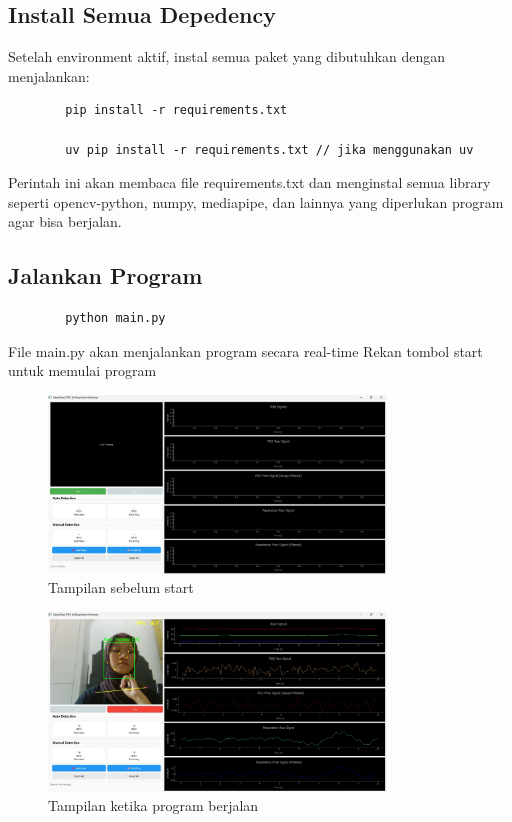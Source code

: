 \documentclass[11pt,a4paper]{article}
\begin{document}
\subsection{Install Semua Depedency}
    Setelah environment aktif, instal semua paket yang dibutuhkan dengan menjalankan:
    \begin{lstlisting}
        pip install -r requirements.txt

        uv pip install -r requirements.txt // jika menggunakan uv\end{lstlisting}
    Perintah ini akan membaca file requirements.txt dan menginstal semua library seperti opencv-python, numpy, mediapipe, dan lainnya yang diperlukan program agar bisa berjalan.

\subsection{Jalankan Program}
    \begin{lstlisting}
        python main.py\end{lstlisting}
    File main.py akan menjalankan program secara real-time
    Rekan tombol start untuk memulai program
    \begin{figure}[h]
    \centering
    \includegraphics[width=0.8\textwidth]{Figure/ready.jpg}
    \caption{Tampilan sebelum start}
    \label{fig:my_label}
    \end{figure}
    \begin{figure}[h]
    \centering
    \includegraphics[width=0.8\textwidth]{Figure/monitoring.jpg}
    \caption{Tampilan ketika program berjalan}
    \label{fig:my_label}
    \end{figure}
    
\end{document}
